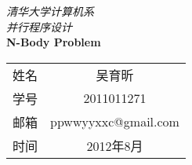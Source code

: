 
\newcommand{\HUGE}{\fontsize{29pt}{29pt}\selectfont} 
\renewcommand{\today}{\number\year 年 \number\month 月 \number\day 日}
\begin{titlepage} 


\phantom{Start!}

\vspace{-1.7cm} 

\begin{flushleft}

\emph{\Large 清华大学计算机系}\\[0.2cm]

\emph{\Large 并行程序设计}\\[4.2cm] 




{ \Huge \bfseries N-Body Problem}\\[0.4cm]


\end{flushleft}

  

 

\vfill 

 

\begin{flushright}

{



\newcommand{\pillar}{ {\Huge \phantom{A}} }

\large

\begin{tabular}{lc}

\pillar 姓名 & 吴育昕\\\cline{2-2}

\pillar 学号 & 2011011271\\\cline{2-2}

\pillar 邮箱 & ppwwyyxxc@gmail.com \\\cline{2-2}

\pillar 时间 & 2012年8月 \\\cline{2-2}


\end{tabular}

} 

\end{flushright} 

\end{titlepage} 
